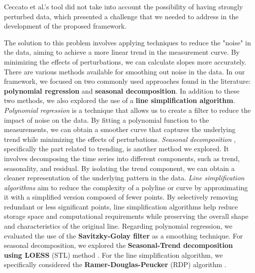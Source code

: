 \noindent Ceccato et al.'s tool did not take into account the possibility of having strongly perturbed data, which presented a challenge that we needed to address in the development of the proposed framework.

\bigskip
The solution to this problem involves applying techniques to reduce the "noise" in the data, aiming to achieve a more linear trend in the measurement curve. By minimizing the effects of perturbations, we can calculate slopes more accurately.\newline
There are various methods available for smoothing out noise in the data. In our framework, we focused on two commonly used approaches found in the literature: \textbf{polynomial regression} and \textbf{seasonal decomposition}. In addition to these two methods, we also explored the use of a \textbf{line simplification algorithm}.\newline \newline
\textit{Polynomial regression} \cite{polynomial_regression} is a technique that allows us to create a filter to reduce the impact of noise on the data. By fitting a polynomial function to the measurements, we can obtain a smoother curve that captures the underlying trend while minimizing the effects of perturbations.\newline
\textit{Seasonal decomposition} \cite{seasonal_decomposition}, specifically the part related to trending, is another method we explored. It involves decomposing the time series into different components, such as trend, seasonality, and residual. By isolating the trend component, we can obtain a cleaner representation of the underlying pattern in the data.\newline
\textit{Line simplification algorithms} \cite{line_simplification_algo} aim to reduce the complexity of a polyline or curve by approximating it with a simplified version composed of fewer points. By selectively removing redundant or less significant points, line simplification algorithms help reduce storage space and computational requirements while preserving the overall shape and characteristics of the original line.\newline
Regarding polynomial regression, we evaluated the use of the \textbf{Savitzky-Golay filter} \cite{savgol} as a smoothing technique. For seasonal decomposition, we explored the \textbf{Seasonal-Trend decomposition using LOESS} (STL) method \cite{stl_decomp}. For the line simplification algorithm, we specifically considered the \textbf{Ramer-Douglas-Peucker} (RDP) algorithm \cite{ramer-douglas-peucker}.\newline \newline
